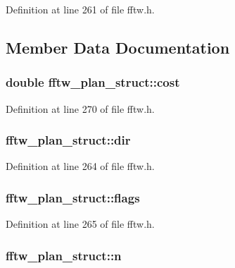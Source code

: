 Definition at line 261 of file fftw.\+h.



\subsection{Member Data Documentation}
\subsubsection[{\texorpdfstring{cost}{cost}}]{\setlength{\rightskip}{0pt plus 5cm}double fftw\+\_\+plan\+\_\+struct\+::cost}\hypertarget{structfftw__plan__struct_af99ad45f9bb1e7847dad9df5e4265ba8}{}\label{structfftw__plan__struct_af99ad45f9bb1e7847dad9df5e4265ba8}


Definition at line 270 of file fftw.\+h.

\subsubsection[{\texorpdfstring{dir}{dir}}]{ fftw\+\_\+plan\+\_\+struct\+::dir}\hypertarget{structfftw__plan__struct_ad01c0441a28c1e72360a6b42f6d63689}{}\label{structfftw__plan__struct_ad01c0441a28c1e72360a6b42f6d63689}


Definition at line 264 of file fftw.\+h.

\subsubsection[{\texorpdfstring{flags}{flags}}]{ fftw\+\_\+plan\+\_\+struct\+::flags}\hypertarget{structfftw__plan__struct_a437b5a527bdd148ae864289d5d173811}{}\label{structfftw__plan__struct_a437b5a527bdd148ae864289d5d173811}


Definition at line 265 of file fftw.\+h.

\subsubsection[{\texorpdfstring{n}{n}}]{ fftw\+\_\+plan\+\_\+struct\+::n}\hypertarget{structfftw__plan__struct_a13ec77a105b6c2e62add092d1d2de42c}{}\label{structfftw__plan__struct_a13ec77a105b6c2e62add092d1d2de42c}


